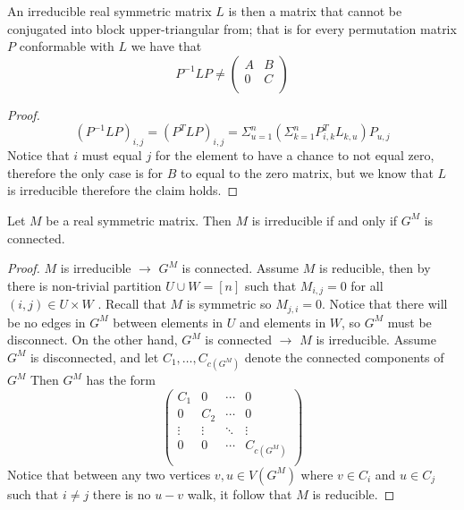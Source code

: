 \documentclass[a4paper, 11pt, oneside]{article}
\newenvironment{problem}[1]
  {\renewcommand\theinnercustomprob{#1}\innercustomprob}
  {\endinnercustomprob}
\begin{document}
\begin{problem}{3.2}\label{problem3.2}
An irreducible real symmetric matrix $L$ is then a matrix that cannot be conjugated into block upper-triangular from; that is for every permutation matrix $P$ conformable with $L$ we have that
\begin{equation*}
P^{-1}LP\neq
\begin{pmatrix}
A  	& B \\ 
0       & C\\
\end{pmatrix} 
\end{equation*}
\end{problem}

\begin{proof}
\begin{equation*}
(P^{-1}LP)_{i,j} = (P^{T}LP)_{i,j} = \Sigma_{u=1}^n (\Sigma_{k=1}^n P^T_{i,k} L_{k,u}) P_{u,j} 
\end{equation*}
Notice that $i$ must equal $j$ for the element to have a chance to not equal zero, therefore the only case is for $B$ to equal to the zero matrix, but we know that $L$ is irreducible therefore the claim holds.
\end{proof}

\begin{problem}{3.3}\label{problem3.3}
Let $M$ be a real symmetric matrix. Then $M$ is irreducible if and only if $G^M$ is connected.
\end{problem}

\begin{proof}
 $M$ is irreducible $\rightarrow$  $G^M$ is connected.
 Assume $M$ is reducible, then by \cite{connectivity_spec} there is non-trivial partition $U\cup W = [n]$ such that $M_{i,j} = 0$ for all $(i,j)\in U \times W$ .
 Recall that $M$ is symmetric so  $M_{j,i} = 0$. Notice that there will be no edges in $G^M$ between elements in $U$ and elements in $W$,  so $G^M$ must be disconnect.
On the other hand,  $G^M$ is connected $\rightarrow$ $M$ is irreducible.
Assume $G^M$ is disconnected, and let $C_1, \ldots, C_{c(G^M)}$ denote the connected components of $G^M$ Then $G^M$ has the form
\begin{equation*}
\begin{pmatrix}
C_1 & 0 &  \cdots & 0 \\ 
0 & C_2 &  \cdots & 0 \\
\vdots & \vdots & \ddots &\vdots \\
0 & 0 & \cdots & C_{c(G^M)} \\ 
\end{pmatrix}
\end{equation*}
Notice that between any two vertices $v, u \in V(G^M)$ where $v \in C_i$ and $u \in C_j$ such that $i \neq j$ there is no $u-v$ walk,
it follow that $M$ is reducible. 
\end{proof}
\end{document}
